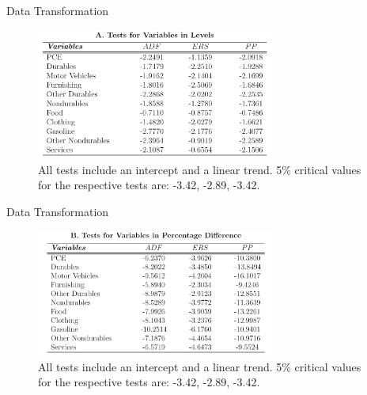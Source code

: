 \documentclass[
  10pt,
  ignorenonframetext,
]{beamer}
\begin{document}
\begin{frame}{Data Transformation}
\protect\hypertarget{data-transformation-1}{}

\begin{figure}
\centering
\includegraphics[width=0.7\textwidth,height=\textheight]{Unit Root - Levels.jpg}
\caption{All tests include an intercept and a linear trend. 5\% critical
values for the respective tests are: -3.42, -2.89, -3.42.}
\end{figure}

\end{frame}

\begin{frame}{Data Transformation}
\protect\hypertarget{data-transformation-2}{}

\begin{figure}
\centering
\includegraphics[width=0.7\textwidth,height=\textheight]{Unit Root - Diff.jpg}
\caption{All tests include an intercept and a linear trend. 5\% critical
values for the respective tests are: -3.42, -2.89, -3.42.}
\end{figure}

\end{frame}
\end{document}
